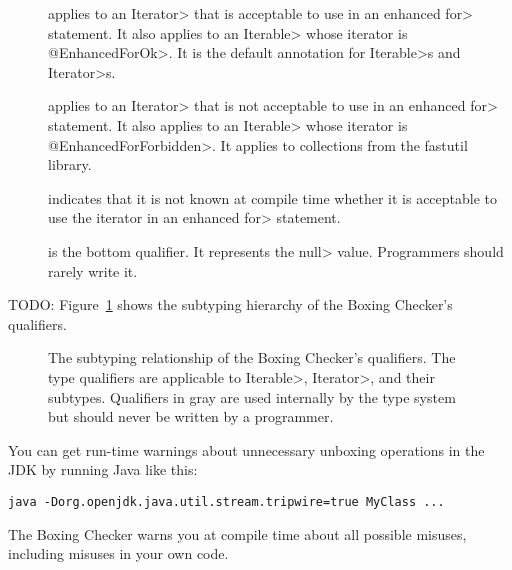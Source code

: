 \begin{description}

\item[]
  applies to an \<Iterator> that is acceptable to use in an enhanced \<for>
  statement.
  It also applies to an \<Iterable> whose iterator is \<@EnhancedForOk>.
  It is the default annotation for \<Iterable>s and \<Iterator>s.

\item[]
  applies to an \<Iterator> that is not acceptable to use in an enhanced \<for>
  statement.
  It also applies to an \<Iterable> whose iterator is \<@EnhancedForForbidden>.
  It applies to collections from the fastutil library.

\item[]
  indicates that it is not known at compile time whether it is acceptable
  to use the iterator in an enhanced \<for> statement.

\item[]
  is the bottom qualifier.  It represents the \<null> value.  Programmers
  should rarely write it.

\end{description}

TODO:
Figure~\ref{fig-enhancedfor-hierarchy} shows the subtyping hierarchy of the
Boxing Checker's qualifiers.

\begin{figure}
\caption{The subtyping relationship of the Boxing Checker's qualifiers.
  The type qualifiers are applicable to \<Iterable>, \<Iterator>, and
  their subtypes.  Qualifiers in gray are used internally by the type
  system but should never be written by a programmer.}
\label{fig-enhancedfor-hierarchy}
\end{figure}



You can get run-time warnings about unnecessary unboxing operations in the
JDK by running Java like this:

\begin{Verbatim}
java -Dorg.openjdk.java.util.stream.tripwire=true MyClass ...
\end{Verbatim}

The Boxing Checker warns you at compile time about all possible
misuses, including misuses in your own code.




